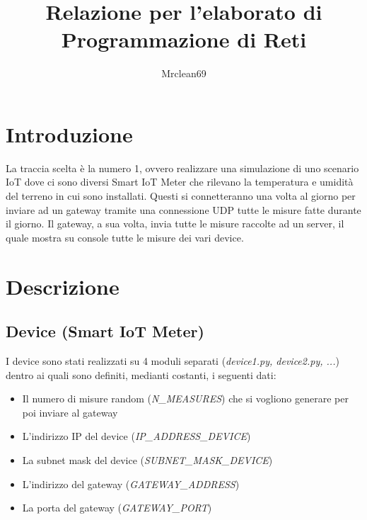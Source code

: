 \documentclass[a4paper, 14pt]{extreport}
\title{Relazione per l'elaborato di Programmazione di Reti}
\author{Mrclean69}
\begin{document}
    \maketitle
    \tableofcontents

    \chapter{Introduzione}
    La traccia scelta è la numero 1, ovvero realizzare una simulazione di uno scenario IoT 
    dove ci sono diversi Smart IoT Meter che rilevano la temperatura e umidità del terreno in cui sono installati.
    Questi si connetteranno una volta al giorno per inviare ad un gateway tramite una connessione UDP tutte le
    misure fatte durante il giorno.
    Il gateway, a sua volta, invia tutte le misure raccolte ad un server, il quale mostra su console tutte le misure
    dei vari device.

    \chapter{Descrizione}

    \section{Device (Smart IoT Meter)}
    I device sono stati realizzati su 4 moduli separati (\emph{device1.py, device2.py, ...})
    dentro ai quali sono definiti, medianti costanti, i seguenti dati:
    \begin{itemize}
        \item Il numero di misure random (\emph{N\_MEASURES}) che si vogliono generare per poi inviare al gateway
        \item L'indirizzo IP del device (\emph{IP\_ADDRESS\_DEVICE})
        \item La subnet mask del device (\emph{SUBNET\_MASK\_DEVICE})
        \item L'indirizzo del gateway (\emph{GATEWAY\_ADDRESS})
        \item La porta del gateway (\emph{GATEWAY\_PORT})
    \end{itemize}
\end{document}
